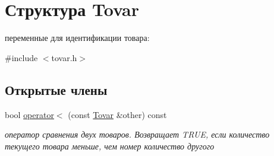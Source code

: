 \hypertarget{struct_tovar}{\section{Структура \-Tovar}
\label{struct_tovar}
}


переменные для идентификации товара\-:  




{\ttfamily \#include $<$tovar.\-h$>$}

\subsection*{Открытые члены}
\begin{DoxyCompactItemize}
\item 
\hypertarget{struct_tovar_ad566921c830e3919dda043641fc85f5e}{bool \hyperlink{struct_tovar_ad566921c830e3919dda043641fc85f5e}{operator$<$} (const \hyperlink{struct_tovar}{\-Tovar} \&other) const }\label{struct_tovar_ad566921c830e3919dda043641fc85f5e}

\begin{DoxyCompactList}\small\item\em оператор сравнения двух товаров. Возвращает \-T\-R\-U\-E, если количество текущего товара меньше, чем номер количество другого \end{DoxyCompactList}\end{DoxyCompactItemize}
